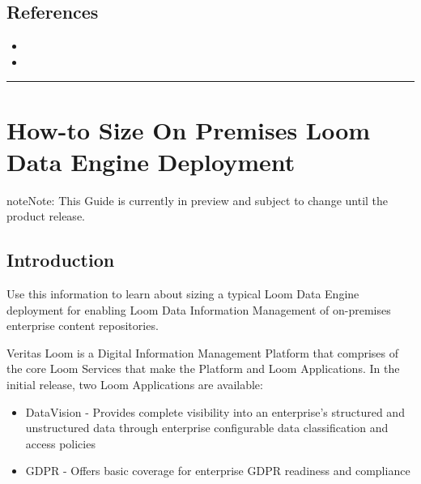 \documentclass[letterpaper,10pt,english]{sphinxmanual}
\begin{document}
\section{References}
\label{\detokenize{loom_trbs_faq:references}}\label{\detokenize{loom_trbs_faq:sizing-ref}}\begin{itemize}
\item {} 

\item {} 

\end{itemize}



\bigskip\hrule\bigskip



\chapter{How-to Size On Premises Loom Data Engine Deployment}
\label{\detokenize{loom_trbs_faq:how-to-size-on-premises-loom-data-engine-deployment}}\label{\detokenize{loom_trbs_faq:ht-loom-op-de-sizing}}
\begin{sphinxadmonition}{note}{Note:}
This Guide is currently in preview and subject to change until the product release.
\end{sphinxadmonition}


\section{Introduction}
\label{\detokenize{loom_trbs_faq:id2}}
Use this information to learn about sizing a typical Loom Data Engine deployment for enabling Loom Data Information Management of on-premises enterprise content repositories.

Veritas Loom is a Digital Information Management Platform that comprises of the core Loom Services that make the Platform and Loom Applications.  In the initial release, two Loom Applications are available:
\begin{itemize}
\item {} 
DataVision - Provides complete visibility into an enterprise’s structured and unstructured data through enterprise configurable data classification and access policies

\item {} 
GDPR - Offers basic coverage for enterprise GDPR readiness and compliance

\end{itemize}
\end{document}

